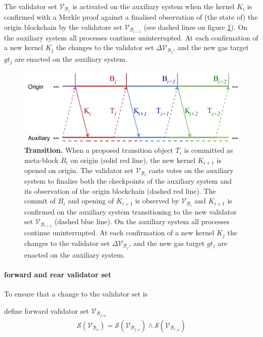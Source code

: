 \documentclass[12pt,a4paper]{article}
\begin{document}
The validator set $\mathcal{V}_{\mathcal{B}_i}$ is activated on the auxiliary system when the kernel $K_i$ is confirmed with a Merkle proof against a finalised observation of (the state of) the origin blockchain by the validators set $\mathcal{V}_{\mathcal{B}_{i-1}}$ (see dashed lines on figure \ref{fig:transition}).
On the auxiliary system all processes continue uninterrupted.
At each confirmation of a new kernel $K_j$ the changes to the validator set $\Delta\mathcal{V}_{\mathcal{B}_j}$, and the new gas target $gt_j$ are enacted on the auxiliary system.

\begin{figure}[htb]
    \centering
	\includegraphics[width=\textwidth]{transition}
	\caption{\textbf{Transition.}
		When a proposed transition object $T_i$ is committed as meta-block $B_i$ on origin (solid red line), the new kernel $K_{i+1}$ is opened on origin.
		The validator set $\mathcal{V}_{\mathcal{B}_i}$ casts votes on the auxiliary system to finalise both the checkpoints of the auxiliary system and its observation of the origin blockchain (dashed red line).
		The commit of $B_i$ and opening of $K_{i+1}$ is observed by $\mathcal{V}_{\mathcal{B}_i}$ and $K_{i+1}$ is confirmed on the auxiliary system transitioning to the new validator set $\mathcal{V}_{\mathcal{B}_{i+1}}$ (dashed blue line).
		On the auxiliary system all processes continue uninterrupted.
		At each confirmation of a new kernel $K_j$ the changes to the validator set $\Delta\mathcal{V}_{\mathcal{B}_j}$, and the new gas target $gt_j$ are enacted on the auxiliary system.
	}
	\label{fig:transition}
\end{figure}

\paragraph{forward and rear validator set} To ensure that a change to the validator set is 

define forward validator set $\mathcal{V}_{\mathcal{B}_{f,n}}$
\begin{align}
  \mathcal{S}(\mathcal{V}_{\mathcal{B}_n}) = \mathcal{S}(\mathcal{V}_{\mathcal{B}_{f,n}}) \land \mathcal{S}(\mathcal{V}_{\mathcal{B}_{r,n}})
\end{align}
\end{document}
